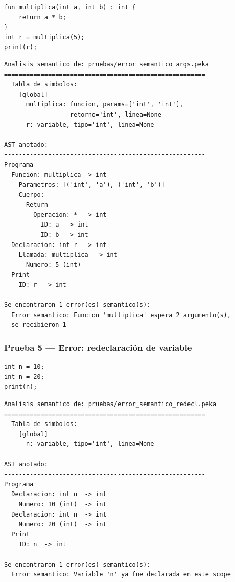 \documentclass[12pt]{article}
\begin{document}
\begin{lstlisting}[caption={error\_semantico\_args.peka}]
fun multiplica(int a, int b) : int {
    return a * b;
}
int r = multiplica(5);
print(r);
\end{lstlisting}

\begin{lstlisting}[caption={Salida — Prueba 4}]
Analisis semantico de: pruebas/error_semantico_args.peka
=======================================================
  Tabla de simbolos:
    [global]
      multiplica: funcion, params=['int', 'int'],
                  retorno='int', linea=None
      r: variable, tipo='int', linea=None

AST anotado:
-------------------------------------------------------
Programa
  Funcion: multiplica -> int
    Parametros: [('int', 'a'), ('int', 'b')]
    Cuerpo:
      Return
        Operacion: *  -> int
          ID: a  -> int
          ID: b  -> int
  Declaracion: int r  -> int
    Llamada: multiplica  -> int
      Numero: 5 (int)
  Print
    ID: r  -> int

Se encontraron 1 error(es) semantico(s):
  Error semantico: Funcion 'multiplica' espera 2 argumento(s),
  se recibieron 1
\end{lstlisting}

\subsubsection{Prueba 5 — Error: redeclaración de variable}

\begin{lstlisting}[caption={error\_semantico\_redecl.peka}]
int n = 10;
int n = 20;
print(n);
\end{lstlisting}

\begin{lstlisting}[caption={Salida — Prueba 5}]
Analisis semantico de: pruebas/error_semantico_redecl.peka
=======================================================
  Tabla de simbolos:
    [global]
      n: variable, tipo='int', linea=None

AST anotado:
-------------------------------------------------------
Programa
  Declaracion: int n  -> int
    Numero: 10 (int)  -> int
  Declaracion: int n  -> int
    Numero: 20 (int)  -> int
  Print
    ID: n  -> int

Se encontraron 1 error(es) semantico(s):
  Error semantico: Variable 'n' ya fue declarada en este scope
\end{lstlisting}
\end{document}

